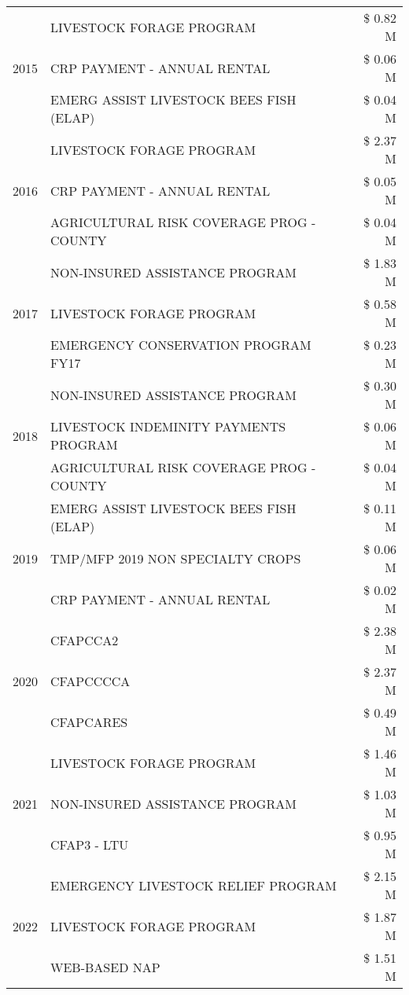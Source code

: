 \begin{tabular}{llr}
\multirow[t]{3}{*}{2015} & LIVESTOCK FORAGE PROGRAM & \$ 0.82 M \\
 & CRP PAYMENT - ANNUAL RENTAL & \$ 0.06 M \\
 & EMERG ASSIST LIVESTOCK BEES FISH (ELAP) & \$ 0.04 M \\
\cline{1-3}
\multirow[t]{3}{*}{2016} & LIVESTOCK FORAGE PROGRAM & \$ 2.37 M \\
 & CRP PAYMENT - ANNUAL RENTAL & \$ 0.05 M \\
 & AGRICULTURAL RISK COVERAGE PROG - COUNTY & \$ 0.04 M \\
\cline{1-3}
\multirow[t]{3}{*}{2017} & NON-INSURED ASSISTANCE PROGRAM & \$ 1.83 M \\
 & LIVESTOCK FORAGE PROGRAM & \$ 0.58 M \\
 & EMERGENCY CONSERVATION PROGRAM FY17 & \$ 0.23 M \\
\cline{1-3}
\multirow[t]{3}{*}{2018} & NON-INSURED ASSISTANCE PROGRAM & \$ 0.30 M \\
 & LIVESTOCK INDEMINITY PAYMENTS PROGRAM & \$ 0.06 M \\
 & AGRICULTURAL RISK COVERAGE PROG - COUNTY & \$ 0.04 M \\
\cline{1-3}
\multirow[t]{3}{*}{2019} & EMERG ASSIST LIVESTOCK BEES FISH (ELAP) & \$ 0.11 M \\
 & TMP/MFP 2019 NON SPECIALTY CROPS & \$ 0.06 M \\
 & CRP PAYMENT - ANNUAL RENTAL & \$ 0.02 M \\
\cline{1-3}
\multirow[t]{3}{*}{2020} & CFAPCCA2 & \$ 2.38 M \\
 & CFAPCCCCA & \$ 2.37 M \\
 & CFAPCARES & \$ 0.49 M \\
\cline{1-3}
\multirow[t]{3}{*}{2021} & LIVESTOCK FORAGE PROGRAM & \$ 1.46 M \\
 & NON-INSURED ASSISTANCE PROGRAM & \$ 1.03 M \\
 & CFAP3 - LTU & \$ 0.95 M \\
\cline{1-3}
\multirow[t]{3}{*}{2022} & EMERGENCY LIVESTOCK RELIEF PROGRAM & \$ 2.15 M \\
 & LIVESTOCK FORAGE PROGRAM & \$ 1.87 M \\
 & WEB-BASED NAP & \$ 1.51 M \\
\cline{1-3}
\bottomrule
\end{tabular}
